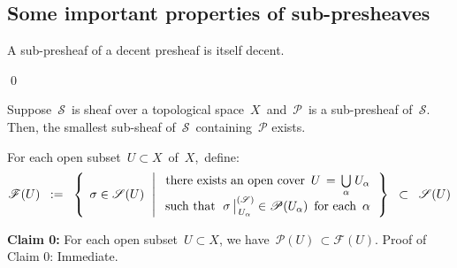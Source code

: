 
\vskip 1.0cm
\subsection{Some important properties of sub-presheaves}
\setcounter{theorem}{0}
\setcounter{equation}{0}

\begin{proposition}\label{subPresheafOfDecentPresheafIsDecent}
\mbox{}\vskip 0.1cm
\noindent
A sub-presheaf of a decent presheaf is itself decent.
\end{proposition}
\proof

\qed

\vskip 0.5cm
\begin{proposition}
\mbox{}\vskip 0.1cm
\noindent
Suppose \,$\mathscr{S}$\, is sheaf over a topological space \,$X$\,
and \,$\mathscr{P}$\, is a sub-presheaf of \,$\mathscr{S}$.
Then, the smallest sub-sheaf of \,$\mathscr{S}$\, containing \,$\mathscr{P}$ exists.
\end{proposition}
\proof
For each open subset \,$U \subset X$\, of \,$X$,\, define:
\begin{equation*}
\mathscr{F}(U)
\;\; := \;\;
	\left\{\;\,
		\sigma \in \mathscr{S}(U)
		\,\;\left\vert\;
			\begin{array}{c}
			\textnormal{there exists an open cover \,$U \,=\, \underset{\alpha}{\bigcup}\;U_{\alpha}$}
			\\
			\textnormal{such that \,$\left.\overset{{\color{white}.}}{\sigma}\,\right\vert^{(\mathscr{S})}_{\,U_{\alpha}} \in \mathscr{P}(U_{\alpha})$\, for each \,$\alpha$}
			\end{array}
			\right.
		\right\}
\;\; \subset \;\;
	\mathscr{S}(U)
\end{equation*}

\vskip 0.5cm
\noindent
\textbf{Claim 0:}\;\;
For each open subset \,$U \subset X$, we have \,$\mathscr{P}(U) \,\subset \mathscr{F}(U)$.
\vskip 0.2cm
\noindent
Proof of Claim 0:\;\; Immediate.

